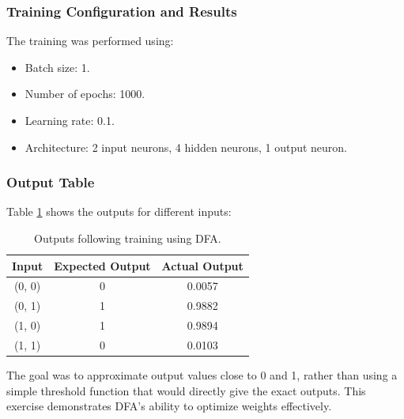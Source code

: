 \documentclass[english]{article}
\begin{document}
\subsubsection*{Training Configuration and Results}
The training was performed using:
\begin{itemize}
    \item Batch size: 1.
    \item Number of epochs: 1000.
    \item Learning rate: 0.1.
    \item Architecture: 2 input neurons, 4 hidden neurons, 1 output neuron.
\end{itemize}

\subsubsection*{Output Table}
Table \ref{tab:trained_XOR} shows the outputs for different inputs:
\begin{table}[!h]
    \centering
    \begin{tabular}{|c|c|c|}
        \hline
            Input & Expected Output & Actual Output \\
            \hline
            (0, 0) & 0 & 0.0057 \\
            (0, 1) & 1 & 0.9882 \\
            (1, 0) & 1 & 0.9894 \\
            (1, 1) & 0 & 0.0103 \\
        \hline
    \end{tabular}
    \caption{Outputs following training using DFA.}\label{tab:trained_XOR}
\end{table}

The goal was to approximate output values close to 0 and 1, rather than using a simple threshold function that would directly give the exact outputs. This exercise demonstrates DFA's ability to optimize weights effectively.

\end{document}
